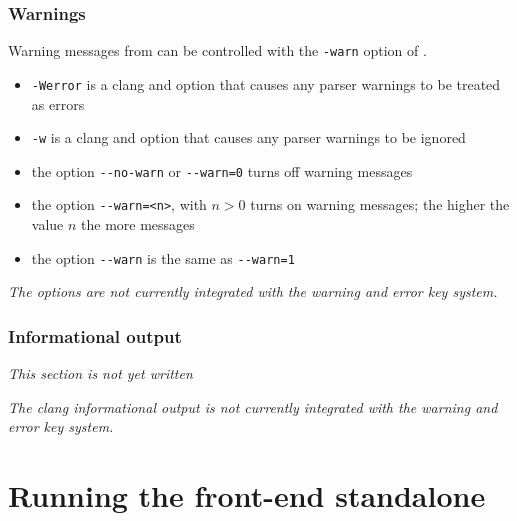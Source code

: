 \subsection{Warnings}


Warning messages from \irg can be controlled with the \lstinline|-warn| option of \irg.

\begin{itemize}
\item \lstinline|-Werror| is a clang and \irg option that causes any parser warnings to be treated as errors
\item \lstinline|-w| is a clang and \irg option that causes any parser warnings to be ignored
\item the \irg option \lstinline|--no-warn| or \lstinline|--warn=0| turns off \irg warning messages
\item the \irg option \lstinline|--warn=<n>|, with $n > 0$ turns on \irg warning messages; the higher the value $n$ the more messages
\item the \irg option \lstinline|--warn| is the same as \lstinline|--warn=1|
\end{itemize}

\textit{The \clang options are not currently integrated with the \fc warning and error key system.}

\subsection{Informational output}

\textit{This section is not yet written}

\textit{The clang informational output is not currently integrated with the \fc warning and error key system.}

\chapter{Running the \fclang front-end standalone}
\label{sec:standalone}

